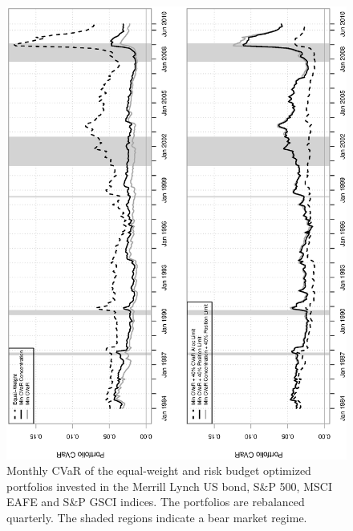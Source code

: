 \documentclass[11pt]{article}
\begin{document}
\begin{figure}[tb]
\caption{Monthly CVaR of the equal-weight and risk budget optimized portfolios invested in the Merrill Lynch US bond, S\&P 500, MSCI EAFE and S\&P GSCI indices. The portfolios are rebalanced quarterly. The shaded regions indicate a bear market regime.   }
\includegraphics[width=12cm,angle=270]{portfolioCVaR.eps}
\end{figure}

\newpage
\end{document}

